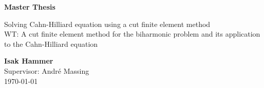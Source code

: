 \documentclass[11pt]{article}
\begin{document}
\begin{titlepage}
    \begin{center}
        \vspace*{1cm}

        \Huge
        \textbf{Master Thesis}

        \vspace{0.5cm}
        \Large
        Solving Cahn-Hilliard equation using a cut finite element method   \\
        WT: A cut finite element method for the biharmonic problem and 
        its application to the Cahn-Hilliard equation

        \vspace{1.5cm}

        \textbf{Isak Hammer} \\
        \vspace{0.5cm}
        Supervisor: André Massing \\
        \vspace{0.5cm}
        \today


        \vfill

        \vspace{0.8cm}


\end{center}
\end{titlepage}
\end{document}
